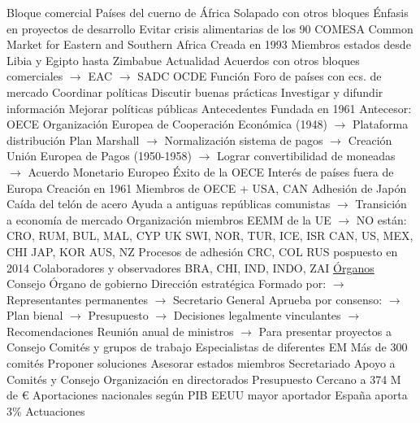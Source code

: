 \documentclass{nuevotema}
\begin{document}
\begin{esquemal}
				\4 Bloque comercial
				\4[] Países del cuerno de África
				\4[] Solapado con otros bloques
				\4 Énfasis en proyectos de desarrollo
				\4[] Evitar crisis alimentarias de los 90
			\3 COMESA
				\4 Common Market for Eastern and Southern Africa
				\4 Creada en 1993
				\4 Miembros
				 estados desde Libia y Egipto hasta Zimbabue
				\4 Actualidad
				\4[] Acuerdos con otros bloques comerciales
				\4[] $\to$ EAC
				\4[] $\to$ SADC
	\1 
		\2 OCDE
			\3 Función
				\4 Foro de países con ecs. de mercado
				\4 Coordinar políticas
				\4 Discutir buenas prácticas
				\4 Investigar y difundir información
				\4 Mejorar políticas públicas
			\3 Antecedentes
				\4 Fundada en 1961
				\4 Antecesor: OECE
				\4[] Organización Europea de Cooperación Económica (1948)
				\4[] $\to$ Plataforma distribución Plan Marshall
				\4[] $\to$ Normalización sistema de pagos
				\4[] $\to$ Creación Unión Europea de Pagos (1950-1958)
				\4[] $\to$ Lograr convertibilidad de moneadas
				\4[] $\to$ Acuerdo Monetario Europeo
				\4 Éxito de la OECE
				\4[] Interés de países fuera de Europa
				\4 Creación en 1961
				\4[] Miembros de OECE + USA, CAN
				\4[] Adhesión de Japón
				\4 Caída del telón de acero
				\4[] Ayuda a antiguas repúblicas comunistas
				\4[] $\to$ Transición a economía de mercado
			\3 Organización
				 miembros
				 EEMM de la UE
				\4[] $\to$ NO están: CRO, RUM, BUL, MAL, CYP
				\4[] UK
				\4[] SWI, NOR, TUR, ICE, ISR
				\4[] CAN, US, MEX, CHI
				\4[] JAP, KOR
				\4[] AUS, NZ
				\4 Procesos de adhesión
				\4[] CRC, COL
				\4[] RUS pospuesto en 2014
				\4 Colaboradores y observadores
				\4[] BRA, CHI, IND, INDO, ZAI
				\4 \underline{Órganos}
				\4 Consejo
				\4[] Órgano de gobierno
				\4[] Dirección estratégica
				\4[] Formado por:
				\4[] $\to$ Representantes permanentes
				\4[] $\to$ Secretario General
				\4[] Aprueba por consenso:
				\4[] $\to$ Plan bienal
				\4[] $\to$ Presupuesto
				\4[] $\to$ Decisiones legalmente vinculantes
				\4[] $\to$ Recomendaciones
				\4[] Reunión anual de ministros
				\4[] $\to$ Para presentar proyectos a Consejo
				\4 Comités y grupos de trabajo
				\4[] Especialistas de diferentes EM
				\4[] Más de 300 comités
				\4[] Proponer soluciones
				\4[] Asesorar estados miembros
				\4 Secretariado
				\4[] Apoyo a Comités y Consejo
				\4[] Organización en directorados
				\4 Presupuesto
				\4[] Cercano a 374 M de €
				\4[] Aportaciones nacionales según PIB
				\4[] EEUU mayor aportador
				\4[] España aporta 3\%
			\3 Actuaciones

\end{esquemal}
\end{document}
